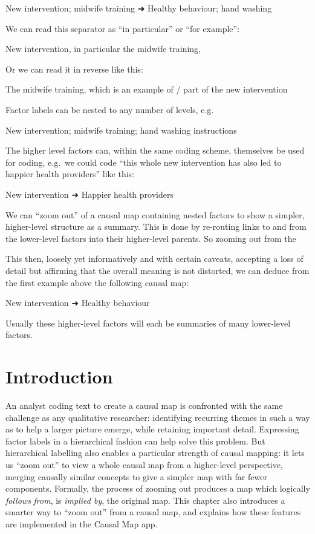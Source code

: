 \documentclass[
]{book}
\begin{document}
New intervention; midwife training ➜ Healthy behaviour; hand washing

We can read this separator as ``in particular'' or ``for example'':

New intervention, in particular the midwife training,

Or we can read it in reverse like this:

The midwife training, which is an example of / part of the new intervention

Factor labels can be nested to any number of levels, e.g.

New intervention; midwife training; hand washing instructions

The higher level factors can, within the same coding scheme, themselves be used for coding, e.g.~we could code ``this whole new intervention has also led to happier health providers'' like this:

New intervention ➜ Happier health providers

We can ``zoom out'' of a causal map containing nested factors to show a simpler, higher-level structure as a summary. This is done by re-routing links to and from the lower-level factors into their higher-level parents. So zooming out from the

This then, loosely yet informatively and with certain caveats, accepting a loss of detail but affirming that the overall meaning is not distorted, we can deduce from the first example above the following causal map:

New intervention ➜ Healthy behaviour

Usually these higher-level factors will each be summaries of many lower-level factors.

\hypertarget{introduction}{%
\section{Introduction}\label{introduction}}

An analyst coding text to create a causal map is confronted with the same challenge as any qualitative researcher: identifying recurring themes in such a way as to help a larger picture emerge, while retaining important detail. Expressing factor labels in a hierarchical fashion can help solve this problem. But hierarchical labelling also enables a particular strength of causal mapping: it lets us ``zoom out'' to view a whole causal map from a higher-level perspective, merging causally similar concepts to give a simpler map with far fewer components. Formally, the process of zooming out produces a map which logically \emph{follows} \emph{from}, is \emph{implied by}, the original map. This chapter also introduces a smarter way to ``zoom out'' from a causal map, and explains how these features are implemented in the Causal Map app.
\end{document}
